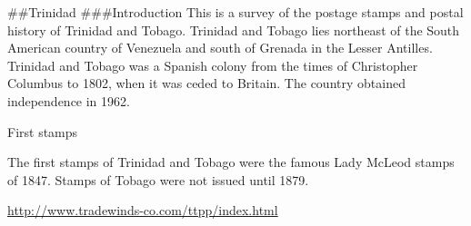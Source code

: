 \#\#Trinidad
\#\#\#Introduction
This is a survey of the postage stamps and postal history of Trinidad and Tobago.
Trinidad and Tobago lies northeast of the South American country of Venezuela and south of Grenada in the Lesser Antilles. Trinidad and Tobago was a Spanish colony from the times of Christopher Columbus to 1802, when it was ceded to Britain. The country obtained independence in 1962.

First stamps

The first stamps of Trinidad and Tobago were the famous Lady McLeod 
stamps of 1847. Stamps of Tobago were not issued until 1879.


\gross

\url{http://www.tradewinds-co.com/ttpp/index.html}



                          